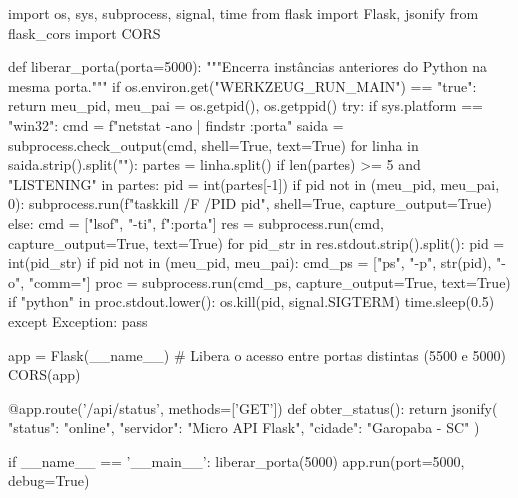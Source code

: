 \begin{boxCodigoPY}
import os, sys, subprocess, signal, time
from flask import Flask, jsonify
from flask_cors import CORS

def liberar_porta(porta=5000):
    """Encerra instâncias anteriores do Python na mesma porta."""
    if os.environ.get("WERKZEUG_RUN_MAIN") == "true":
        return
    meu_pid, meu_pai = os.getpid(), os.getppid()
    try:
        if sys.platform == "win32":
            cmd = f"netstat -ano | findstr :{porta}"
            saida = subprocess.check_output(cmd, shell=True, text=True)
            for linha in saida.strip().split("\n"):
                partes = linha.split()
                if len(partes) >= 5 and "LISTENING" in partes:
                    pid = int(partes[-1])
                    if pid not in (meu_pid, meu_pai, 0):
                        subprocess.run(f"taskkill /F /PID {pid}",
                                       shell=True, capture_output=True)
        else:
            cmd = ["lsof", "-ti", f":{porta}"]
            res = subprocess.run(cmd, capture_output=True, text=True)
            for pid_str in res.stdout.strip().split():
                pid = int(pid_str)
                if pid not in (meu_pid, meu_pai):
                    cmd_ps = ["ps", "-p", str(pid), "-o", "comm="]
                    proc = subprocess.run(cmd_ps, capture_output=True,
                                          text=True)
                    if "python" in proc.stdout.lower():
                        os.kill(pid, signal.SIGTERM)
                        time.sleep(0.5)
    except Exception:
        pass

app = Flask(__name__)
# Libera o acesso entre portas distintas (5500 e 5000)
CORS(app)

@app.route('/api/status', methods=['GET'])
def obter_status():
    return jsonify({
        "status": "online",
        "servidor": "Micro API Flask",
        "cidade": "Garopaba - SC"
    })

if __name__ == '__main__':
    liberar_porta(5000)
    app.run(port=5000, debug=True)
\end{boxCodigoPY}

